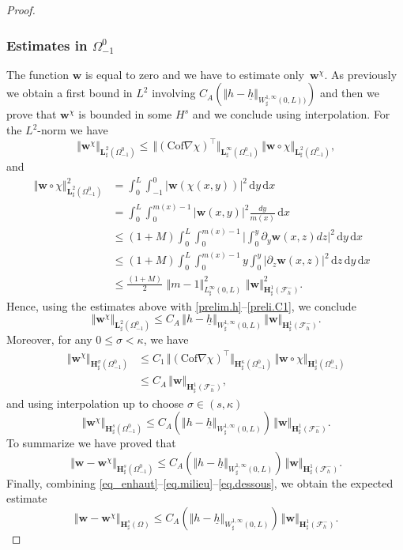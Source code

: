 \documentclass[11pt]{article}
\let\mathcal\mathscr
\theoremstyle{remark}
\theoremstyle{definition}
\newcommand{\norme}[1]{\,\Vert #1\Vert}
\newcommand{\vnorme}[1]{\Vert #1\Vert}
\newcommand{\bnorme}[1]{\,\bigl\Vert #1\bigr\Vert}
\newcommand{\dd}{\,\mathrm{d}}
\newcommand{\wg}{\boldsymbol{w}}
\newcommand{\BS}[1]{\boldsymbol{#1}}
\let\CM\Omega
\newcommand{\hb}{{\underline{h}}}
\newcommand{\Cof}{\mathrm{Cof}}
\begin{document}
\begin{proof}
\subsubsection*{Estimates in $\Omega_{-1}^{0}$} The function $\wg$ is equal to zero and we have to estimate only~$\wg^\chi$. As previously we obtain a first bound in $L^{2}$ involving $C_A(\vnorme{h-\hb}_{W^{1,\infty}_{\sharp}(0,L))})$ and then we prove that $\wg^\chi$ is bounded in some $H^{s}$ and we conclude using interpolation. For the $L^{2}$-norm we have
\[
\norme{\wg^\chi}_{\BS{L}^{2}_{\sharp}(\Omega_{-1}^{0})}\leq \norme{(\Cof\nabla\chi)^{\top}}_{\BS{L}^{\infty}_{\sharp}(\Omega_{-1}^{0})}\norme{\wg\circ\chi}_{\BS{L}^{2}_{\sharp}(\Omega_{-1}^{0})},
\]
and
\[
\begin{aligned}
\norme{\wg\circ\chi}^2_{\BS{L}^{2}_{\sharp}(\Omega_{-1}^{0})}&=\int_{0}^{L}\int_{-1}^{0}\vert \wg(\chi(x,y))\vert^{2}\dd y\dd x&{}\\
&=\int_{0}^{L}\int_{0}^{m(x)-1}\vert \wg(x,y)\vert^{2}\frac{dy}{m(x)}\dd x\\
&\leq (1+M)\int_{0}^{L}\int_{0}^{m(x)-1}\biggl\vert\int_{0}^{y}\partial_y\wg(x,z)dz\biggr\vert^{2}\dd y\dd x\\
&\leq (1+M)\int_{0}^{L}\int_{0}^{m(x)-1}y\int_{0}^{y}\vert\partial_z\wg(x,z)\vert^{2}\dd z\dd y\dd x\\
&\leq \frac{(1+M)}{2}\,\norme{m-1}_{L^{\infty}_{\sharp}(0,L)}^{2}\,\norme{\wg}_{\BS{H}^{1}_{\sharp}(\mathcal{F}^{-}_{h})}^{2}.
\end{aligned}
\]
Hence, using the estimates above with \eqref{prelim.h}--\eqref{preli.C1}, we conclude
\[\norme{\wg^\chi}_{\BS{L}^{2}_{\sharp}(\Omega_{-1}^{0})}\leq C_A\norme{h-\hb}_{W^{1,\infty}_{\sharp}(0,L)}\norme{\wg}_{\BS{H}^{1}_{\sharp}(\mathcal{F}^{-}_{h})}.
\]
Moreover, for any $0\leq \sigma<\kappa$, we have
\[
\begin{aligned}
\norme{\wg^\chi}_{\BS{H}^{\sigma}_{\sharp}(\Omega_{-1}^{0})}&{}\leq C_{1}\bnorme{(\Cof\nabla\chi)^{\top}}_{\BS{H}^{\kappa}_{\sharp}(\Omega_{-1}^{0})}\norme{\wg\circ\chi}_{\BS{H}^{1}_{\sharp}(\Omega_{-1}^{0})}\\
&\leq C_A\norme{\wg}_{\BS{H}^{1}_{\sharp}(\mathcal{F}^{-}_{h})},
\end{aligned}
\]
and using interpolation up to choose $\sigma \in (s,\kappa)$
\[\norme{\wg^\chi}_{\BS{H}^{s}_{\sharp}(\Omega_{-1}^{0})}\leq C_A(\vnorme{h-\hb}_{W^{1,\infty}_{\sharp}(0,L)})\norme{\wg}_{\BS{H}^{1}_{\sharp}(\mathcal{F}^{-}_{h})}.\]
To summarize we have proved that
\begin{equation} \label{eq.dessous}
\norme{\wg-\wg^\chi}_{\BS{H}^{s}_{\sharp}(\Omega_{-1}^0)}\leq C_A(\vnorme{h-\hb}_{W^{1,\infty}_{\sharp}(0,L)})\norme{\wg}_{\BS{H}^{1}_{\sharp}(\mathcal{F}^{-}_{h})}.
\end{equation}
Finally, combining \eqref{eq_enhaut}--\eqref{eq.milieu}--\eqref{eq.dessous}, we obtain the expected estimate
\begin{equation} \label{eq.total}
\norme{\wg-\wg^\chi}_{\BS{H}^{s}_{\sharp}(\CM)}\leq C_A(\vnorme{h-\hb}_{W^{1,\infty}_{\sharp}(0,L)})\norme{\wg}_{\BS{H}^{1}_{\sharp}(\mathcal{F}^{-}_{h})}.
\end{equation}


\end{proof}
\end{document}
